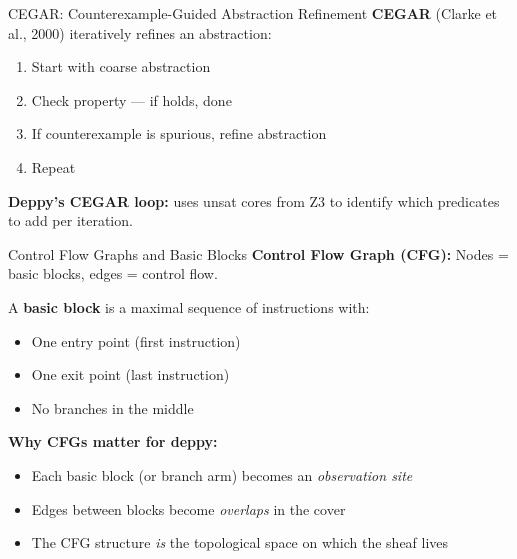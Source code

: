 \documentclass[aspectratio=169,10pt]{beamer}
\begin{document}
\begin{frame}{CEGAR: Counterexample-Guided Abstraction Refinement}
\textbf{CEGAR} (Clarke et al., 2000) iteratively refines an abstraction:

\begin{center}
\end{center}

\vspace{0.3em}
\begin{enumerate}
  \item Start with coarse abstraction
  \item Check property --- if holds, done
  \item If counterexample is spurious, refine abstraction
  \item Repeat
\end{enumerate}

\textbf{Deppy's CEGAR loop:} uses unsat cores from Z3 to identify which predicates to add per iteration.
\end{frame}

\begin{frame}{Control Flow Graphs and Basic Blocks}
\textbf{Control Flow Graph (CFG):} Nodes = basic blocks, edges = control flow.

A \textbf{basic block} is a maximal sequence of instructions with:
\begin{itemize}
  \item One entry point (first instruction)
  \item One exit point (last instruction)
  \item No branches in the middle
\end{itemize}

\vspace{0.3em}
\textbf{Why CFGs matter for deppy:}
\begin{itemize}
  \item Each basic block (or branch arm) becomes an \emph{observation site}
  \item Edges between blocks become \emph{overlaps} in the cover
  \item The CFG structure \emph{is} the topological space on which the sheaf lives
\end{itemize}
\end{frame}
\end{document}
